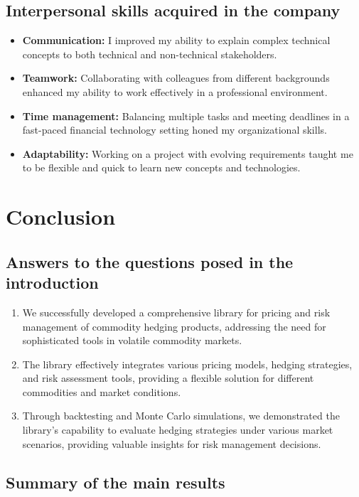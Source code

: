 \documentclass[12pt]{article}
\begin{document}
\subsection{Interpersonal skills acquired in the company}

\begin{itemize}
    \item \textbf{Communication:} I improved my ability to explain complex technical concepts to both technical and non-technical stakeholders.
    \item \textbf{Teamwork:} Collaborating with colleagues from different backgrounds enhanced my ability to work effectively in a professional environment.
    \item \textbf{Time management:} Balancing multiple tasks and meeting deadlines in a fast-paced financial technology setting honed my organizational skills.
    \item \textbf{Adaptability:} Working on a project with evolving requirements taught me to be flexible and quick to learn new concepts and technologies.
\end{itemize}

\section{Conclusion}

\subsection{Answers to the questions posed in the introduction}

\begin{enumerate}
    \item We successfully developed a comprehensive library for pricing and risk management of commodity hedging products, addressing the need for sophisticated tools in volatile commodity markets.
    \item The library effectively integrates various pricing models, hedging strategies, and risk assessment tools, providing a flexible solution for different commodities and market conditions.
    \item Through backtesting and Monte Carlo simulations, we demonstrated the library's capability to evaluate hedging strategies under various market scenarios, providing valuable insights for risk management decisions.
\end{enumerate}

\subsection{Summary of the main results}
\end{document}
